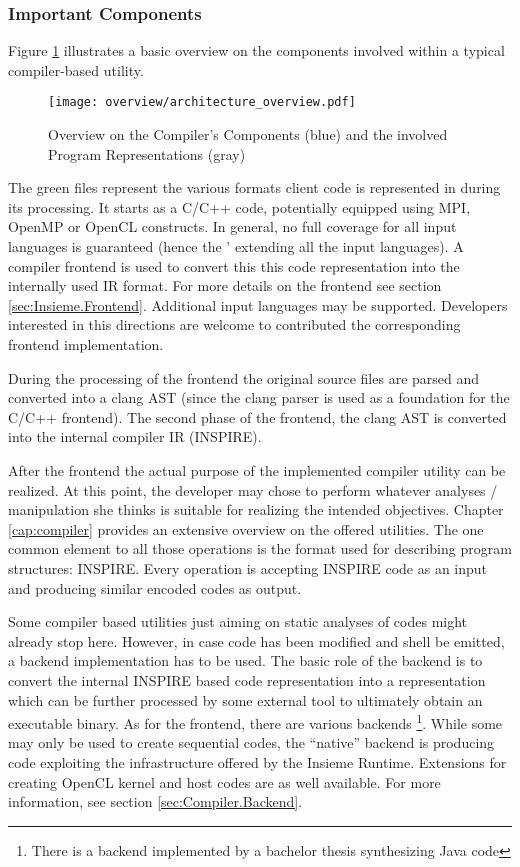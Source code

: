 \subsubsection{Important Components}
Figure \ref{fig:Overview.Compiler.Components} illustrates a basic overview on
the components involved within a typical compiler-based utility. 
\begin{figure}[tb]
	\centering
	\texttt{[image: overview/architecture\_overview.pdf]}
	\caption{Overview on the Compiler's Components (blue) and the involved Program Representations (gray)}
	\label{fig:Overview.Compiler.Components}
\end{figure}
The green files represent the various formats client code is represented in
during its processing. It starts as a C/C++ code, potentially equipped using
MPI, OpenMP or OpenCL constructs. In general, no full coverage for all input
languages is guaranteed (hence the ' extending all the input languages). A
compiler frontend is used to convert this this code representation into the
internally used IR format. For more details on the frontend see section
\ref{sec:Insieme.Frontend}. Additional input languages may be supported.
Developers interested in this directions are welcome to contributed the
corresponding frontend implementation.

During the processing of the frontend the original source files are parsed and
converted into a clang AST (since the clang parser is used as a foundation for
the C/C++ frontend). The second phase of the frontend, the clang AST is
converted into the internal compiler IR (INSPIRE).

After the frontend the actual purpose of the implemented compiler utility can be
realized. At this point, the developer may chose to perform whatever analyses /
manipulation she thinks is suitable for realizing the intended objectives.
Chapter \ref{cap:compiler} provides an extensive overview on the offered
utilities. The one common element to all those operations is the format used for
describing program structures: INSPIRE. Every operation is accepting INSPIRE
code as an input and producing similar encoded codes as output.

Some compiler based utilities just aiming on static analyses of codes might
already stop here. However, in case code has been modified and shell be emitted,
a backend implementation has to be used. The basic role of the backend is to
convert the internal INSPIRE based code representation into a representation
which can be further processed by some external tool to ultimately obtain an
executable binary. As for the frontend, there are various backends
\footnote{There is a backend implemented by a bachelor thesis synthesizing Java
code}. While some may only be used to create sequential codes, the ``native''
backend is producing code exploiting the infrastructure offered by the Insieme
Runtime. Extensions for creating OpenCL kernel and host codes are as well
available. For more information, see section \ref{sec:Compiler.Backend}.

